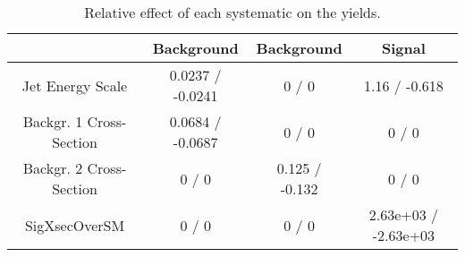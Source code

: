 \documentclass[10pt]{article}
\begin{document}
\begin{table}[htbp]
\begin{center}
\begin{tabular}{|c|c|c|c|}
\hline 
      & Background      & Background      & Signal \\ 
\hline 
  Jet Energy Scale & 0.0237 / -0.0241 & 0 / 0 & 1.16 / -0.618 \\ 
  Backgr. 1 Cross-Section & 0.0684 / -0.0687 & 0 / 0 & 0 / 0 \\ 
  Backgr. 2 Cross-Section & 0 / 0 & 0.125 / -0.132 & 0 / 0 \\ 
 SigXsecOverSM & 0 / 0 & 0 / 0 & 2.63e+03 / -2.63e+03 \\ 
\hline 
\end{tabular} 
\caption{Relative effect of each systematic on the yields.} 
\end{center} 
\end{table} 
\end{document}
